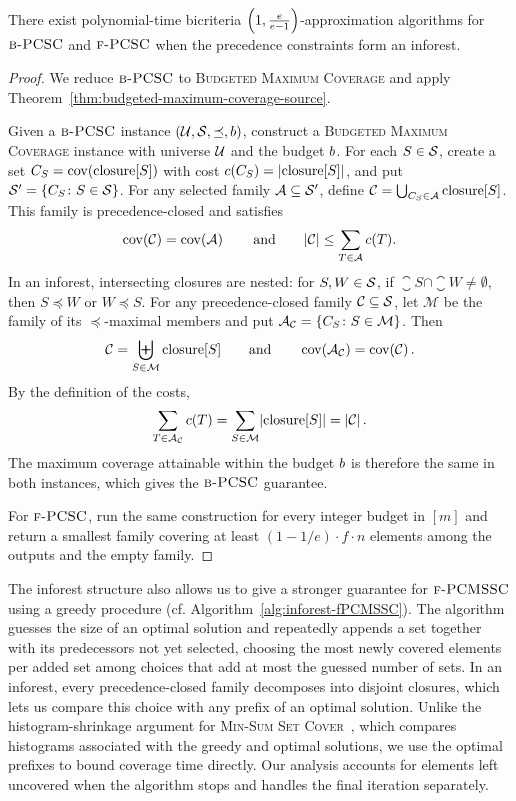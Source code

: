 \begin{theorem}\label{thm:BPCSC-inforest}
    \setlength{\emergencystretch}{2em}
    There exist polynomial-time bicriteria $\mathopen{}\left( 1, \frac{e}{e-1} \right)$-approximation algorithms for $\textup{\textsc{b-PCSC}}$ and $\textup{\textsc{f-PCSC}}$ when the precedence constraints form an inforest.
\end{theorem}
\begin{proof}
    We reduce $\textup{\textsc{b-PCSC}}$ to \textup{\textsc{Budgeted Maximum Coverage}} and apply Theorem~\ref{thm:budgeted-maximum-coverage-source}.

    Given a $\textup{\textsc{b-PCSC}}$ instance $(\mathcal{U},\mathcal{S},\preceq,b)$, construct a \textup{\textsc{Budgeted Maximum Coverage}} instance with universe $\mathcal{U}$ and the budget $b$. For each $S\in\mathcal{S}$, create a set $C_S=\operatorname{cov}\mathopen{}\left( \operatorname{closure}[S] \right)$ with cost $c(C_S)=\mathopen{}\left| \operatorname{closure}[S] \right|$, and put $\mathcal{S}'=\mathopen{}\left\{ C_S\colon S\in\mathcal{S} \right\}$.
    For any selected family $\mathcal{A}\subseteq\mathcal{S}'$, define $\mathcal{C}=\bigcup_{C_S\in\mathcal{A}}\operatorname{closure}[S]$. This family is precedence-closed and satisfies
    \[
        \operatorname{cov}\mathopen{}\left( \mathcal{C} \right)=\operatorname{cov}\mathopen{}\left( \mathcal{A} \right)
        \qquad\text{and}\qquad
        \mathopen{}\left| \mathcal{C} \right|\leq\sum_{T\in\mathcal{A}}c(T).
    \]
    In an inforest, intersecting closures are nested: for $S,W\in\mathcal{S}$, if $\closure{S}\cap\closure{W}\neq\emptyset$, then $S\preceq W$ or $W\preceq S$. For any precedence-closed family $\mathcal{C}\subseteq\mathcal{S}$, let $\mathcal{M}$ be the family of its $\preceq$-maximal members and put $\mathcal{A}_{\mathcal{C}}=\mathopen{}\left\{ C_S\colon S\in\mathcal{M} \right\}$. Then
    \[
        \mathcal{C}=\biguplus_{S\in\mathcal{M}}\operatorname{closure}[S]
        \qquad\text{and}\qquad
        \operatorname{cov}\mathopen{}\left( \mathcal{A}_{\mathcal{C}} \right)=\operatorname{cov}\mathopen{}\left( \mathcal{C} \right).
    \]
    By the definition of the costs,
    \[
        \sum_{T\in\mathcal{A}_{\mathcal{C}}}c(T)
        =\sum_{S\in\mathcal{M}}\mathopen{}\left| \operatorname{closure}[S] \right|=\mathopen{}\left| \mathcal{C} \right|.
    \]
    The maximum coverage attainable within the budget $b$ is therefore the same in both instances, which gives the $\textup{\textsc{b-PCSC}}$ guarantee.

For $\textup{\textsc{f-PCSC}}$, run the same construction for every integer budget in $[m]$ and return a smallest family covering at least $(1-1/e)\cdot f\cdot n$ elements among the outputs and the empty family.
\end{proof}

The inforest structure also allows us to give a stronger guarantee for $\textup{\textsc{f-PCMSSC}}$ using a greedy procedure (cf. Algorithm~\ref{alg:inforest-fPCMSSC}). The algorithm guesses the size of an optimal solution and repeatedly appends a set together with its predecessors not yet selected, choosing the most newly covered elements per added set among choices that add at most the guessed number of sets. In an inforest, every precedence-closed family decomposes into disjoint closures, which lets us compare this choice with any prefix of an optimal solution. Unlike the histogram-shrinkage argument for \textup{\textsc{Min-Sum Set Cover}}~\cite{ApproximatingMinSumSetCover}, which compares histograms associated with the greedy and optimal solutions, we use the optimal prefixes to bound coverage time directly. Our analysis accounts for elements left uncovered when the algorithm stops and handles the final iteration separately.


